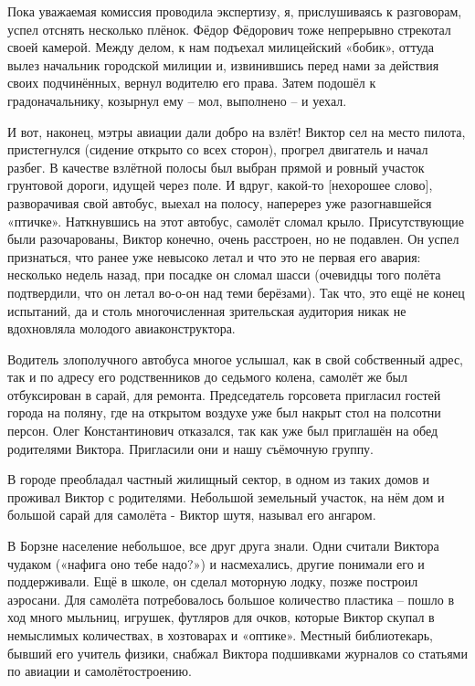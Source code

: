 Пока уважаемая комиссия проводила экспертизу, я, прислушиваясь к разговорам,
успел отснять несколько плёнок. Фёдор Фёдорович тоже непрерывно стрекотал своей
камерой. Между делом, к нам подъехал милицейский «бобик», оттуда вылез
начальник городской милиции и, извинившись перед нами за действия своих
подчинённых, вернул водителю его права. Затем подошёл к градоначальнику,
козырнул ему – мол, выполнено – и уехал.

И вот, наконец, мэтры авиации дали добро на взлёт! Виктор сел на место пилота,
пристегнулся (сидение открыто со всех сторон), прогрел двигатель и начал
разбег. В качестве взлётной полосы был выбран прямой и ровный участок грунтовой
дороги, идущей через поле. И вдруг, какой-то [нехорошее слово], разворачивая
свой автобус, выехал на полосу, наперерез уже разогнавшейся «птичке».
Наткнувшись на этот автобус, самолёт сломал крыло. Присутствующие были
разочарованы, Виктор конечно, очень расстроен, но не подавлен. Он успел
признаться, что ранее уже невысоко летал и что это не первая его авария:
несколько недель назад, при посадке он сломал шасси (очевидцы того полёта
подтвердили, что он летал во-о-он над теми берёзами). Так что, это ещё не конец
испытаний, да и столь многочисленная зрительская аудитория никак не вдохновляла
молодого авиаконструктора.

Водитель злополучного автобуса многое услышал, как в свой собственный адрес,
так и по адресу его родственников до седьмого колена, самолёт же был
отбуксирован в сарай, для ремонта. Председатель горсовета пригласил гостей
города на поляну, где на открытом воздухе уже был накрыт стол на полсотни
персон. Олег Константинович отказался, так как уже был приглашён на обед
родителями Виктора. Пригласили они и нашу съёмочную группу.

В городе преобладал частный жилищный сектор, в одном из таких домов и проживал
Виктор с родителями. Небольшой земельный участок, на нём дом и большой сарай
для самолёта - Виктор шутя, называл его ангаром.

В Борзне население небольшое, все друг друга знали. Одни считали Виктора
чудаком («нафига оно тебе надо?») и насмехались, другие понимали его и
поддерживали. Ещё в школе, он сделал моторную лодку, позже построил аэросани.
Для самолёта потребовалось большое количество пластика – пошло в ход много
мыльниц, игрушек, футляров для очков, которые Виктор скупал в немыслимых
количествах, в хозтоварах и «оптике». Местный библиотекарь, бывший его учитель
физики, снабжал Виктора подшивками журналов со статьями по авиации и
самолётостроению.


